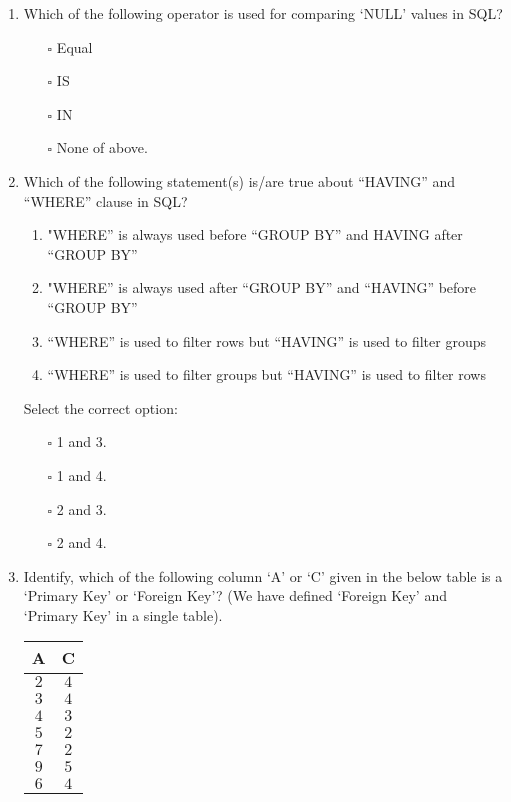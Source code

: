 \documentclass[10pt]{article}
\newcommand{\lightrule}{%
	\arrayrulecolor{black!30}%
	\midrule[\lightrulewidth]%
	\arrayrulecolor{black}}
\begin{document}
\begin{enumerate}
			\item Which of the following operator is used for comparing ‘NULL’ values in SQL?
				\begin{enumerate}
					\item[$\square$] Equal
					\item[$\square$] IS
					\item[$\square$] IN
					\item[$\square$] None of above.
				\end{enumerate}

			\item Which of the following statement(s) is/are true about “HAVING” and “WHERE” clause in SQL?
				\begin{enumerate}
					\item "WHERE” is always used before “GROUP BY” and HAVING after “GROUP BY”
					\item "WHERE” is always used after “GROUP BY” and “HAVING” before “GROUP BY”
					\item “WHERE” is used to filter rows but “HAVING” is used to filter groups
					\item “WHERE” is used to filter groups but “HAVING” is used to filter rows
				\end{enumerate}
				Select the correct option:
				\begin{enumerate}
					\item[$\square$] 1 and 3.
					\item[$\square$] 1 and 4.
					\item[$\square$] 2 and 3.
					\item[$\square$] 2 and 4.
				\end{enumerate}

			\item Identify, which of the following column ‘A’ or ‘C’ given in the below table is a ‘Primary Key’ or ‘Foreign Key’? (We have defined ‘Foreign Key’ and ‘Primary Key’ in a single table).
				\begin{center}
					\centering
					\begin{tabular}{@{} *{2}{c} @{}}
						\toprule
							\textbf{A} & \textbf{C} \\
						\midrule
							$2$ & $4$  \\ 
						\lightrule
							$3$ & $4$  \\  
						\lightrule
							$4$ & $3$  \\
						\lightrule 
							$5$ & $2$  \\ 
						\lightrule 
							$7$ & $2$  \\ 
						\lightrule 
							$9$ & $5$  \\ 
						\lightrule 
							$6$ & $4$  \\
						\bottomrule
					\end{tabular}
				\end{center}


\end{enumerate}
\end{document}
